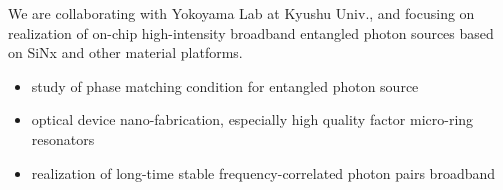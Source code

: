 \documentclass[12pt,a4paper]{altacv}
\begin{document}
\tagline{}

\begin{fullwidth}
\makecvheader
\end{fullwidth}



We are collaborating with Yokoyama Lab at Kyushu Univ., and focusing on realization of on-chip high-intensity broadband entangled photon sources based on SiNx and other material platforms.
\begin{itemize}
    \item study of phase matching condition for entangled photon source
    \item optical device nano-fabrication, especially high quality factor micro-ring resonators
    \item realization of long-time stable frequency-correlated photon pairs broadband
\end{itemize}
\divider
\end{document}
